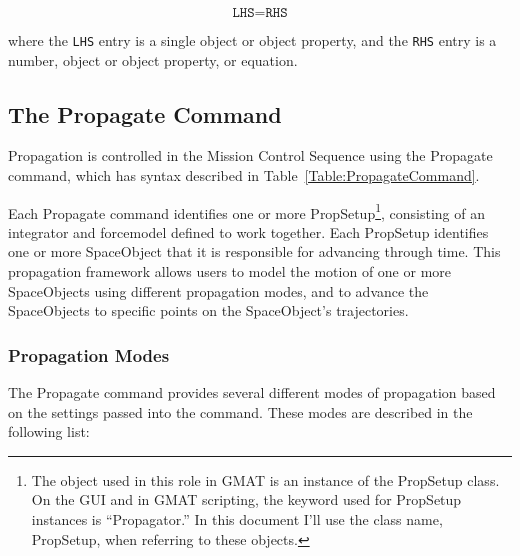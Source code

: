 \begin{equation}
\texttt{LHS}=\texttt{RHS}
\end{equation}

\noindent where the \texttt{LHS} entry is a single object or object property, and the \texttt{RHS}
entry is a number, object or object property, or equation.



\subsection{\label{section:Propagate}The Propagate Command}

Propagation is controlled in the Mission Control Sequence using the Propagate command, which has
syntax described in Table~\ref{Table:PropagateCommand}.



\noindent Each Propagate command identifies one or more PropSetup\footnote{The object used in this
role in GMAT is an instance of the PropSetup class.  On the GUI and in GMAT scripting, the keyword
used for PropSetup instances is ``Propagator.''  In this document I'll use the class name,
PropSetup, when referring to these objects.}, consisting of an integrator and forcemodel defined to
work together.  Each PropSetup identifies one or more SpaceObject that it is responsible for
advancing through time.  This propagation framework allows users to model the motion of one or more
SpaceObjects using different propagation modes, and to advance the SpaceObjects to specific points
on the SpaceObject's trajectories.

\subsubsection{Propagation Modes}

The Propagate command provides several different modes of propagation based on the settings passed
into the command.  These modes are described in the following list:

